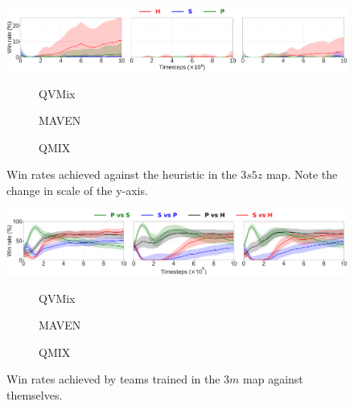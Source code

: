 \begin{subfigure}{\textwidth}
    \centering
    \includegraphics[width=.95\textwidth]{figures/ch7/3s5z_tiny_heuristic_plot_qvmixmavenqmix.pdf}
    \begin{subfigure}{.05\textwidth}
    \centering
    \caption*{}
    \end{subfigure}%
    \begin{subfigure}{.31\textwidth}
    \renewcommand\thesubfigure{\alph{subfigure}.1}
      \centering
      \caption{QVMix}
      \label{subfig:3s5z_vs_h_methodQVMIX}
    \end{subfigure}%
    \begin{subfigure}{.31\textwidth}
    \addtocounter{subfigure}{-1}
    \renewcommand\thesubfigure{\alph{subfigure}.2}
      \centering
      \caption{MAVEN}
      \label{subfig:3s5z_vs_h_methodMAVEN}
    \end{subfigure}%
    \begin{subfigure}{.31\textwidth}
    \addtocounter{subfigure}{-1}
    \renewcommand\thesubfigure{\alph{subfigure}.3}
      \centering
      \caption{QMIX}
      \label{subfig:3s5z_vs_h_methodQMIX}
    \end{subfigure}
\addtocounter{subfigure}{-1}
\caption{Win rates achieved against the heuristic in the $3s5z$ map. Note the change in scale of the y-axis.}
\label{subfig:3s5z_vsh}
\end{subfigure}
\begin{subfigure}{\textwidth}
\centering
    \includegraphics[width=.95\textwidth]{figures/ch7/tiny_perf_self_popu.pdf}
    \begin{subfigure}{.05\textwidth}
    \centering
    \caption*{}
    \end{subfigure}%
    \begin{subfigure}{.31\textwidth}
    \renewcommand\thesubfigure{\alph{subfigure}.1}
      \centering
      \caption{QVMix}
      \label{subfig:duo_methodQVMIX}
    \end{subfigure}%
    \begin{subfigure}{.31\textwidth}
    \addtocounter{subfigure}{-1}
    \renewcommand\thesubfigure{\alph{subfigure}.2}
      \centering
      \caption{MAVEN}
      \label{subfig:duo_methodMAVEN}
    \end{subfigure}%
    \begin{subfigure}{.31\textwidth}
    \addtocounter{subfigure}{-1}
    \renewcommand\thesubfigure{\alph{subfigure}.3}
      \centering
      \caption{QMIX}
      \label{subfig:duo_methodQMIX}
    \end{subfigure}
\addtocounter{subfigure}{-1}
\caption{Win rates achieved by teams trained in the $3m$ map against themselves.}
\label{subfig:3m_duo}
\end{subfigure}
